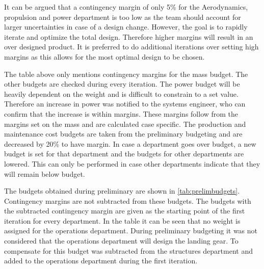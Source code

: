 It can be argued that a contingency margin of only 5\% for the Aerodynamics, propulsion and power department is too low as the team should account for larger uncertainties in case of a design change. However, the goal is to rapidly iterate and optimize the total design. Therefore higher margins will result in an over designed product. It is preferred to do additional iterations over setting high margins as this allows for the most optimal design to be chosen.

The table above only mentions contingency margins for the mass budget. The other budgets are checked during every iteration. The power budget will be heavily dependent on the weight and is difficult to constrain to a set value. Therefore an increase in power was notified to the systems engineer, who can confirm that the increase is within margins. These margins follow from the margins set on the mass and are calculated case specific. The production and maintenance cost budgets are taken from the preliminary budgeting and are decreased by 20\% to have margin. In case a department goes over budget, a new budget is set for that department and the budgets for other departments are lowered. This can only be performed in case other departments indicate that they will remain below budget.

The budgets obtained during preliminary are shown in \autoref{tab:prelimbudgets}. Contingency margins are not subtracted from these budgets. The budgets with the subtracted contingency margin are given as the starting point of the first iteration for every department. In the table it can be seen that no weight is assigned for the operations department. During preliminary budgeting it was not considered that the operations department will design the landing gear. To compensate for this budget was subtracted from the structures department and added to the operations department during the first iteration.

